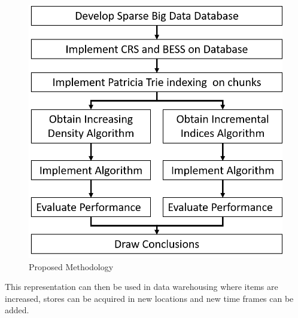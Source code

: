  \begin{figure}[H]
 	\centering
 	\includegraphics[width=0.7\linewidth]{proposedMethod2}
 	\caption{Proposed Methodology}
 	\label{fig:proposedmethod}
 \end{figure}
 
This representation can then be used in data warehousing where items are increased, stores can be acquired in new locations and new time frames can be added.
